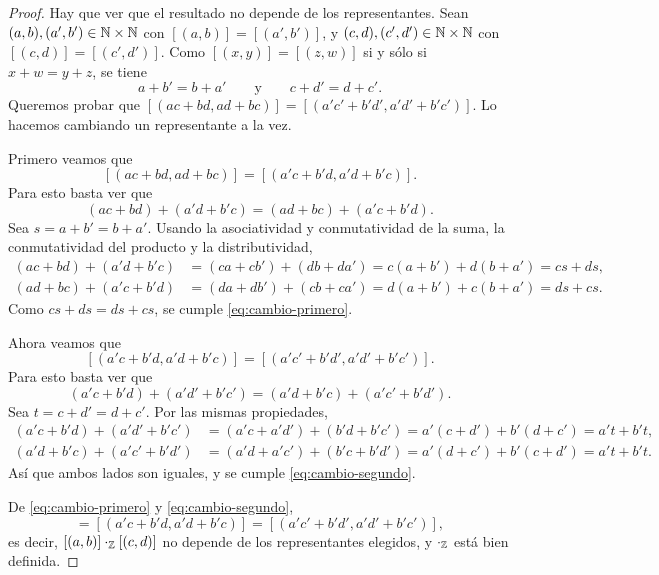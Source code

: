 \documentclass[12pt,a4paper]{article}
\begin{document}
    \begin{proof}
        Hay que ver que el resultado no depende de los representantes. Sean
        $(a,b),(a',b')\in\mathbb{N}\times\mathbb{N}$ con $[(a,b)]=[(a',b')]$, y $(c,d),(c',d')\in\mathbb{N}\times\mathbb{N}$ con
        $[(c,d)]=[(c',d')]$. Como $[(x,y)]=[(z,w)]$ si y sólo si $x+w=y+z$, se tiene
        \begin{equation*}
            a+b'=b+a' \qquad\text{y}\qquad c+d'=d+c'.
        \end{equation*}
        Queremos probar que $[(ac+bd,ad+bc)]=[(a'c'+b'd',a'd'+b'c')]$. Lo hacemos cambiando un representante a la vez.

        Primero veamos que
        \begin{equation}\label{eq:cambio-primero}
            [(ac+bd,ad+bc)]=[(a'c+b'd,a'd+b'c)].
        \end{equation}
        Para esto basta ver que
        \begin{equation*}
            (ac+bd)+(a'd+b'c)=(ad+bc)+(a'c+b'd).
        \end{equation*}
        Sea $s=a+b'=b+a'$. Usando la asociatividad y conmutatividad de la suma, la conmutatividad del producto y la
        distributividad,
        \begin{align*}
            (ac+bd)+(a'd+b'c) &= (ca+cb')+(db+da') = c(a+b')+d(b+a') = cs+ds,\\
            (ad+bc)+(a'c+b'd) &= (da+db')+(cb+ca') = d(a+b')+c(b+a') = ds+cs.
        \end{align*}
        Como $cs+ds=ds+cs$, se cumple \eqref{eq:cambio-primero}.

        Ahora veamos que
        \begin{equation}\label{eq:cambio-segundo}
            [(a'c+b'd,a'd+b'c)]=[(a'c'+b'd',a'd'+b'c')].
        \end{equation}
        Para esto basta ver que
        \begin{equation*}
            (a'c+b'd)+(a'd'+b'c')=(a'd+b'c)+(a'c'+b'd').
        \end{equation*}
        Sea $t=c+d'=d+c'$. Por las mismas propiedades,
        \begin{align*}
            (a'c+b'd)+(a'd'+b'c') &= (a'c+a'd')+(b'd+b'c') = a'(c+d')+b'(d+c') = a't+b't,\\
            (a'd+b'c)+(a'c'+b'd') &= (a'd+a'c')+(b'c+b'd') = a'(d+c')+b'(c+d') = a't+b't.
        \end{align*}
        Así que ambos lados son iguales, y se cumple \eqref{eq:cambio-segundo}.

        De \eqref{eq:cambio-primero} y \eqref{eq:cambio-segundo},
        \begin{equation*}
            [(ac+bd,ad+bc)]=[(a'c+b'd,a'd+b'c)]=[(a'c'+b'd',a'd'+b'c')],
        \end{equation*}
        es decir, $[(a,b)]\cdot_{\mathbb{Z}}[(c,d)]$ no depende de los representantes elegidos, y $\cdot_{\mathbb{Z}}$ está bien
        definida.
    \end{proof}
\end{document}
